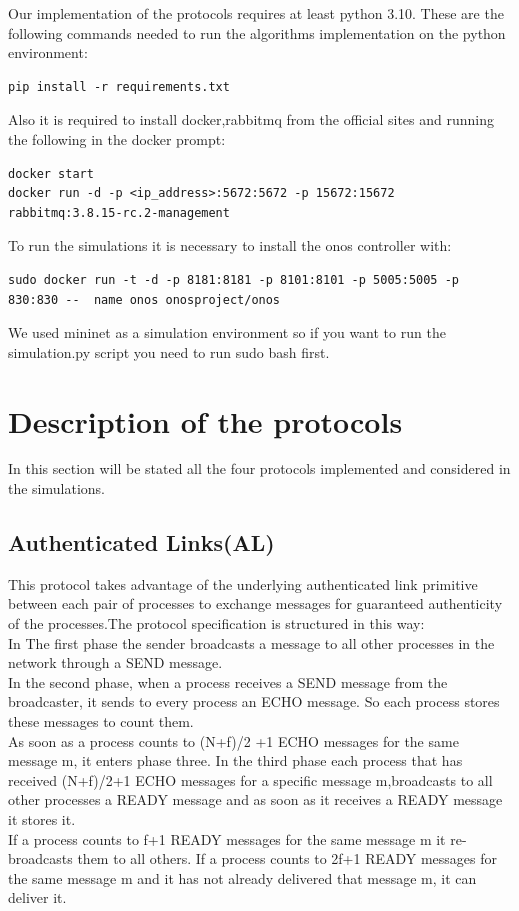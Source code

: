 \documentclass[12pt]{article}
\begin{document}
Our implementation of the protocols requires at least python 3.10.
These are the following commands needed to run the algorithms implementation on the python environment:
\begin{lstlisting}
pip install -r requirements.txt
\end{lstlisting}
Also it is required to install docker,rabbitmq from the official sites and running the following in the docker prompt:
\begin{lstlisting}
docker start
docker run -d -p <ip_address>:5672:5672 -p 15672:15672 rabbitmq:3.8.15-rc.2-management
\end{lstlisting}
To run the simulations it is necessary to install the onos controller with:
\begin{lstlisting}
sudo docker run -t -d -p 8181:8181 -p 8101:8101 -p 5005:5005 -p 830:830 --	name onos onosproject/onos
\end{lstlisting}
We used mininet as a simulation environment so if you want to run the simulation.py script you need to run sudo bash first.\\

\newpage

\section{Description of the protocols}
In this section will be stated all the four protocols implemented and considered in the simulations.
\\
\subsection{Authenticated Links(AL)}
This protocol takes advantage of the underlying authenticated link primitive between each pair of processes to exchange messages for guaranteed authenticity of the processes.The protocol specification is structured in this way:\\
In The first phase the sender broadcasts a message to all other processes in the network through a SEND message.\\
In the second phase, when a process receives a SEND message from the broadcaster, it sends to every process an ECHO message. So each process stores these messages to count them.\\
As soon as a process counts to (N+f)/2 +1 ECHO messages for the same message m, it enters phase three.
In the third phase each process that has received (N+f)/2+1 ECHO messages for a specific message m,broadcasts to all other processes a READY message and as soon as it receives a READY message it stores it. \\If a process counts to f+1 READY messages for the same message m it re-broadcasts them to all others.  If a process counts to 2f+1 READY messages for the same message m and it has not already delivered that message m, it can deliver it. \\
\\
\end{document}
